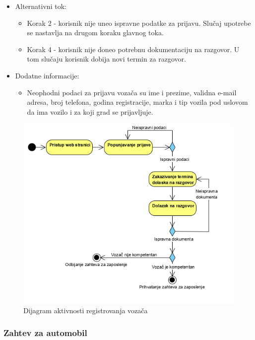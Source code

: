 \begin{itemize}
\begin{enumerate}
		\end{enumerate}
	\item Alternativni tok:
		\begin{itemize}
    		\item Korak 2 - korisnik nije uneo ispravne podatke za prijavu. Slučaj upotrebe se nastavlja na drugom koraku glavnog toka.
		    \item Korak 4 - korisnik nije doneo potrebnu dokumentaciju na razgovor. U tom slučaju korisnik dobija novi termin za razgovor.
		\end{itemize}
	\item Dodatne informacije:
		\begin{itemize}
			\item Neophodni podaci za prijavu vozača su ime i prezime, validna e-mail adresa, broj telefona, godina registracije, marka i tip vozila pod uslovom da ima vozilo i za koji grad se prijavljuje.
		\end{itemize}						
\end{itemize}

\begin{figure}[H]
\begin{left}
\includegraphics[width=\textwidth]{Slike/RegistracijaVozaca.png}
\end{left}
    \caption{Dijagram aktivnosti registrovanja vozača}
\label{fig:RegistracijaVozaca}
\end{figure}

\subsubsection{\bfseries Zahtev za automobil}

